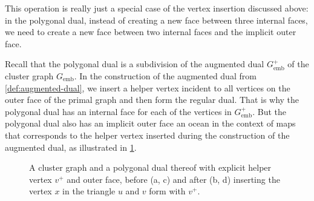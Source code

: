 This operation is really just a special case of the vertex insertion discussed above: in the polygonal dual, instead of creating a new face between three internal faces, we need to create a new face between two internal faces and the implicit outer face.

Recall that the polygonal dual is a subdivision of the augmented dual $G_\text{emb}^+$ of the cluster graph $G_\text{emb}$.
In the construction of the augmented dual from \cref{def:augmented-dual}, we insert a helper vertex incident to all vertices on the outer face of the primal graph and then form the regular dual.
That is why the polygonal dual has an internal face for each of the vertices in $G_\text{emb}^+$.
But the polygonal dual also has an implicit outer face \emdash{} an ocean in the context of maps \emdash{} that corresponds to the helper vertex inserted during the construction of the augmented dual, as illustrated in \cref{fig:insert-vertex-duality}.

\begin{figure}[H]
	\centering
	\quad
	\qquad
	\quad
	\caption{A cluster graph and a polygonal dual thereof with explicit helper vertex $v^+$ and outer face, before (a, c) and after (b, d) inserting the vertex $x$ in the triangle $u$ and $v$ form with $v^+$.}
	\label{fig:insert-vertex-duality}
\end{figure}

